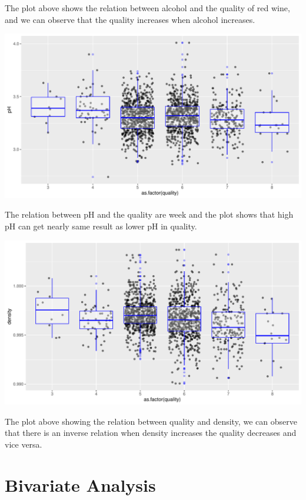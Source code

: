 \documentclass[]{article}
\begin{document}
The plot above shows the relation between alcohol and the quality of red
wine, and we can observe that the quality increases when alcohol
increases.

\begin{center}\includegraphics{Figs/unnamed-chunk-12-1} \end{center}

The relation between pH and the quality are week and the plot shows that
high pH can get nearly same result as lower pH in quality.

\begin{center}\includegraphics{Figs/unnamed-chunk-13-1} \end{center}

The plot above showing the relation between quality and density, we can
observe that there is an inverse relation when density increases the
quality decreases and vice versa.

\hypertarget{bivariate-analysis}{%
\section{Bivariate Analysis}\label{bivariate-analysis}}
\end{document}
